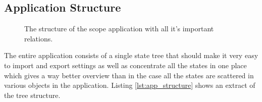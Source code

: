 %
%

\subsection{Application Structure}

\begin{figure}
    \centering
    
    \caption[The scope structure]{%
        The structure of the scope application with all it's important relations.%
    }
    \label{fig:gui:structure}
\end{figure}

The entire application consists of a single state tree that should make it very easy to import and export settings as well as concentrate all the states in one place which gives a way better overview than in the case all the states are scattered in various objects in the application.
Listing \ref{lst:app_structure} shows an extract of the tree structure.

